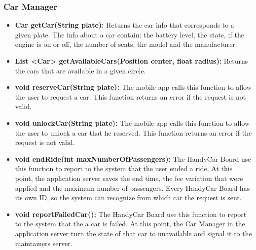 \subsubsection{Car Manager}
\begin{itemize}
	\item \textbf{Car getCar(String plate):} Returns the car info that corresponds to a given plate.
	The info about a car contain: the battery level, the state, if the engine is on or off, the number of seats, the model and the manufacturer.
	\item \textbf{List \textless Car\textgreater{} getAvailableCars(Position center, float radius):} Returns the cars that are available in a given circle.
	\item \textbf{void reserveCar(String plate):} The mobile app calls this function to allow the user to request a car. This function returns an error if the request is not valid.
	\item \textbf{void unlockCar(String plate):} The mobile app calls this function to allow the user to unlock a car that he reserved. This function returns an error if the request is not valid.
	\item \textbf{void endRide(int maxNumberOfPassengers):} The HandyCar Board use this function to report to the system that the user ended a ride. At this point, the application server saves the end time, the fee variation that were applied and the maximum number of passengers. Every HandyCar Board has its own ID, so the system can recognize from which car the request is sent.
	\item \textbf{void reportFailedCar():} The HandyCar Board use this function to report to the system that the a car is failed. At this point, the Car Manager in the application server turn the state of that car to unavailable and signal it to the maintainers server.
\end{itemize}

